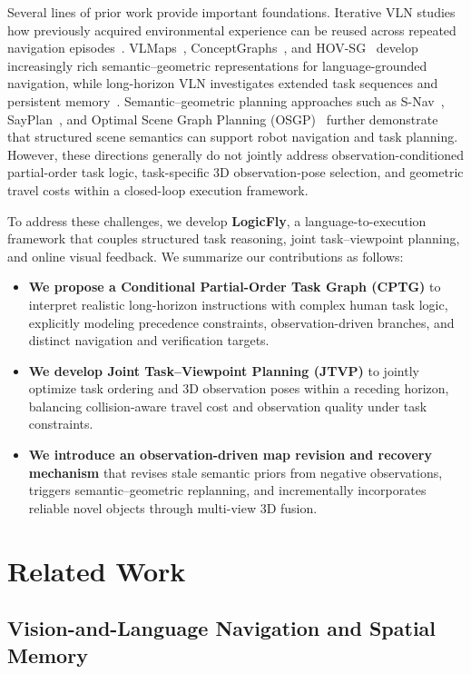 \documentclass[letterpaper,10pt,conference]{ieeeconf}
\begin{document}
Several lines of prior work provide important foundations. Iterative VLN studies how previously acquired environmental experience can be reused across repeated navigation episodes~\cite{krantz2023ivln}. VLMaps~\cite{huang2023vlmaps}, ConceptGraphs~\cite{gu2024conceptgraphs}, and HOV-SG~\cite{werby2024hovsg} develop increasingly rich semantic--geometric representations for language-grounded navigation, while long-horizon VLN investigates extended task sequences and persistent memory~\cite{song2024lhvln}. Semantic--geometric planning approaches such as S-Nav~\cite{kremer2023snav}, SayPlan~\cite{rana2023sayplan}, and Optimal Scene Graph Planning (OSGP)~\cite{dai2024osgp} further demonstrate that structured scene semantics can support robot navigation and task planning. However, these directions generally do not jointly address observation-conditioned partial-order task logic, task-specific 3D observation-pose selection, and geometric travel costs within a closed-loop execution framework.

To address these challenges, we develop \textbf{LogicFly}, a language-to-execution framework that couples structured task reasoning, joint task--viewpoint planning, and online visual feedback. We summarize our contributions as follows:
\begin{itemize}
\setlength{\itemsep}{0pt}
\setlength{\parsep}{0pt}
\item \textbf{We propose a Conditional Partial-Order Task Graph (CPTG)} to interpret realistic long-horizon instructions with complex human task logic, explicitly modeling precedence constraints, observation-driven branches, and distinct navigation and verification targets.
\item \textbf{We develop Joint Task--Viewpoint Planning (JTVP)} to jointly optimize task ordering and 3D observation poses within a receding horizon, balancing collision-aware travel cost and observation quality under task constraints.
\item \textbf{We introduce an observation-driven map revision and recovery mechanism} that revises stale semantic priors from negative observations, triggers semantic--geometric replanning, and incrementally incorporates reliable novel objects through multi-view 3D fusion.
\end{itemize}

\section{Related Work}
\subsection{Vision-and-Language Navigation and Spatial Memory}
\end{document}
